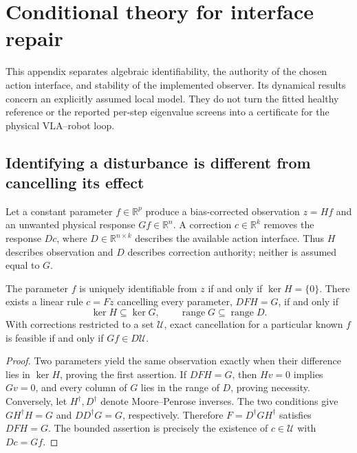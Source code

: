\section{Conditional theory for interface repair}
\label{app:composite-theory}

This appendix separates algebraic identifiability, the authority of the chosen
action interface, and stability of the implemented observer. Its dynamical
results concern an explicitly assumed local model. They do not turn the fitted
healthy reference or the reported per-step eigenvalue screens into a certificate
for the physical VLA--robot loop.

\subsection{Identifying a disturbance is different from cancelling its effect}

Let a constant parameter $f\in\mathbb R^p$ produce a bias-corrected observation
$z=Hf$ and an unwanted physical response $Gf\in\mathbb R^n$. A correction
$c\in\mathbb R^k$ removes the response $Dc$, where $D\in\mathbb R^{n\times k}$
describes the available action interface. Thus $H$ describes observation and $D$
describes correction authority; neither is assumed equal to $G$.

\begin{proposition}
\label{prop:authority}
The parameter $f$ is uniquely identifiable from $z$ if and only if
$\ker H=\{0\}$. There exists a linear rule $c=Fz$ cancelling every parameter,
$DFH=G$, if and only if
\begin{equation}\label{eq:authority-factorization}
\ker H\subseteq\ker G,\qquad
\operatorname{range}G\subseteq\operatorname{range}D.
\end{equation}
With corrections restricted to a set $\mathcal U$, exact cancellation for a
particular known $f$ is feasible if and only if $Gf\in D\mathcal U$.
\end{proposition}
\begin{proof}
Two parameters yield the same observation exactly when their difference lies
in $\ker H$, proving the first assertion. If $DFH=G$, then $Hv=0$ implies
$Gv=0$, and every column of $G$ lies in the range of $D$, proving necessity.
Conversely, let $H^\dagger,D^\dagger$ denote Moore--Penrose inverses. The two
conditions give $GH^\dagger H=G$ and $DD^\dagger G=G$, respectively. Therefore
$F=D^\dagger GH^\dagger$ satisfies $DFH=G$. The bounded assertion is precisely
the existence of $c\in\mathcal U$ with $Dc=Gf$.
\end{proof}

